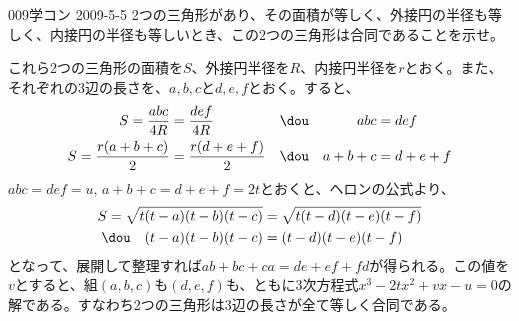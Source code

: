 \begin{prob}{009}{}{学コン 2009-5-5}
 2つの三角形があり、その面積が等しく、外接円の半径も等しく、内接円の半径も等しいとき、この2つの三角形は合同であることを示せ。
\end{prob}

これら2つの三角形の面積を$S$、外接円半径を$R$、内接円半径を$r$とおく。また、それぞれの3辺の長さを、$a, b, c$と$d, e, f$とおく。すると、
\begin{align*}
 S=\frac{abc}{4R}&=\frac{def}{4R} & &\dou & abc&=def \\
 S=\frac{r(a+b+c)}{2}&=\frac{r(d+e+f)}{2} & &\dou & a+b+c&=d+e+f
\end{align*}
$abc=def=u$, $a+b+c=d+e+f=2t$とおくと、ヘロンの公式より、
\begin{align*}
 S=\sqrt{t(t-a)(t-b)(t-c)}&=\sqrt{t(t-d)(t-e)(t-f)} \\
 \dou \quad (t-a)(t-b)(t-c)&=(t-d)(t-e)(t-f)
\end{align*}
となって、展開して整理すれば$ab+bc+ca=de+ef+fd$が得られる。この値を$v$とすると、組$(a, b, c)$も$(d, e, f)$も、ともに3次方程式$x^3-2tx^2+vx-u=0$の解である。すなわち2つの三角形は3辺の長さが全て等しく合同である。